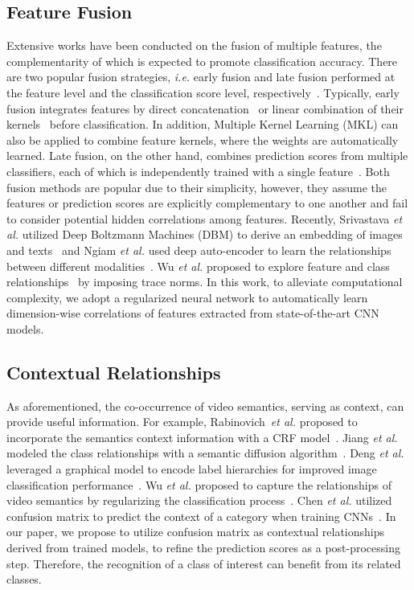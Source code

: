 \documentclass[journal]{IEEEtran}
\makeatletter
\newcommand*{\ie}{\emph{i.e.}\@\xspace}
\newcommand*{\etal}{\emph{et al.}\@\xspace}
\makeatother
\begin{document}
\subsection{Feature Fusion}
Extensive works have been conducted on the fusion of multiple features, the complementarity of which is expected to promote classification accuracy. There are two popular fusion strategies, \ie early fusion and late fusion performed at the feature level and the classification score level, respectively~\cite{snoek2005early,yang2013multi}. Typically, early fusion integrates features by direct concatenation~\cite{wang2013action} or linear combination of their kernels~\cite{zhang2007local} before classification.
In addition, Multiple Kernel Learning (MKL) can also be applied to combine feature kernels, where the weights are automatically learned. Late fusion, on the other hand, combines prediction scores from multiple classifiers, each of which is independently trained with a single feature~\cite{ye2012robust,liu2013sample}. Both fusion methods are popular due to their simplicity, however, they assume the features or prediction scores are explicitly complementary to one another and fail to consider potential hidden correlations among features. Recently, Srivastava \etal utilized Deep Boltzmann Machines (DBM) to derive an embedding of images and texts~\cite{Srivastava2015} and Ngiam \etal used deep auto-encoder to learn the relationships between different modalities~\cite{ngiam2011multimodal}. Wu \etal proposed to explore feature and class relationships~\cite{mm14:videoclassification} by imposing trace norms. In this work, to alleviate computational complexity, we adopt a regularized neural network to automatically learn dimension-wise correlations of features extracted from state-of-the-art CNN models.


\subsection{Contextual Relationships}
As aforementioned, the co-occurrence of video semantics, serving as context, can provide useful information. For example, Rabinovich~\etal proposed to incorporate the semantics context information with a CRF model~\cite{rabinovich2007objects}. Jiang \etal modeled the class relationships with a semantic diffusion algorithm~\cite{iccv09:dasd}. Deng \etal leveraged a graphical model to encode label hierarchies for improved image classification performance~\cite{deng2009imagenet}. Wu \etal proposed to capture the relationships of video semantics by regularizing the classification process~\cite{mm14:videoclassification}. Chen \etal utilized confusion matrix to predict the context of a category when training CNNs~\cite{chen2015webly}. In our paper, we propose to utilize confusion matrix as contextual relationships derived from trained models, to refine the prediction scores as a post-processing step. Therefore, the recognition of a class of interest can benefit from its related classes.
\end{document}
